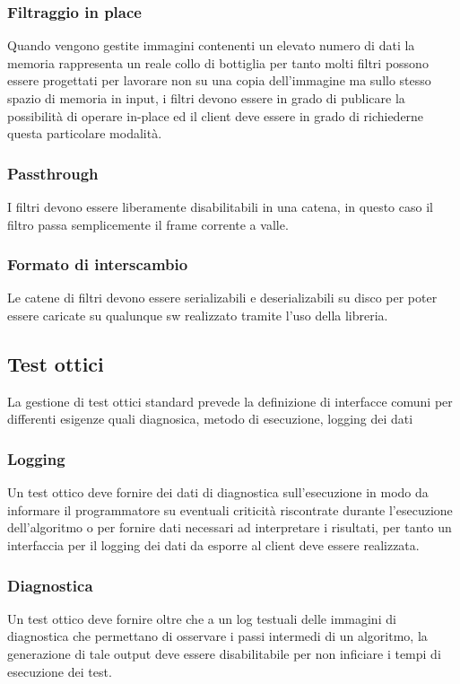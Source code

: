 \subsubsection{Filtraggio in place}
Quando vengono gestite immagini contenenti un elevato numero di dati la memoria rappresenta un reale collo di bottiglia per tanto molti filtri possono essere progettati per lavorare non su una copia dell'immagine ma sullo stesso spazio di memoria in input, i filtri devono essere in grado di publicare la possibilità di operare in-place ed il client deve essere in grado di richiederne questa particolare modalità.

\subsubsection{Passthrough}
I filtri devono essere liberamente disabilitabili in una catena, in questo caso il filtro passa semplicemente il frame corrente a valle.

\subsubsection{Formato di interscambio}
Le catene di filtri devono essere serializabili e deserializabili su disco per poter essere caricate su qualunque sw realizzato tramite l'uso della libreria.

\subsection{Test ottici}
La gestione di test ottici standard prevede la definizione di interfacce comuni per differenti esigenze quali diagnosica, metodo di esecuzione, logging dei dati

\subsubsection{Logging}
Un test ottico deve fornire dei dati di diagnostica sull'esecuzione in modo da informare il programmatore su eventuali criticità riscontrate durante l'esecuzione dell'algoritmo o per fornire dati necessari ad interpretare i risultati, per tanto un interfaccia per il logging dei dati da esporre al client deve essere realizzata.

\subsubsection{Diagnostica}
Un test ottico deve fornire oltre che a un log testuali delle immagini di diagnostica che permettano di osservare i passi intermedi di un algoritmo, la generazione di tale output deve essere disabilitabile per non inficiare i tempi di esecuzione dei test.


